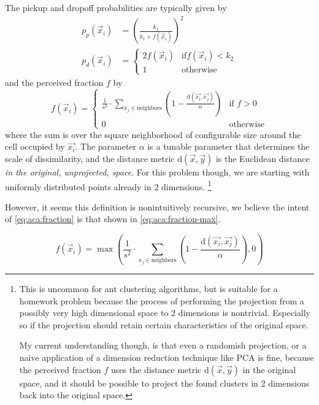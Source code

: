 \documentclass[12pt]{article}
\begin{document}
The pickup and dropoff probabilities are typically given by
\begin{align}
    p_p(\vec x_i) & = {\left(\frac{k_1}{k_1 + f(\vec x_i)}\right)}^2\label{eq:aca:pickup} \\
    p_d(\vec x_i) & = \begin{cases}
        2 f(\vec x_i) & \text{if} f(\vec x_i) < k_2 \\
        1             & \text{otherwise}
    \end{cases}\label{eq:aca:dropoff}
\end{align}
and the perceived fraction $f$ by
\begin{equation}
    f(\vec x_i) = \begin{cases}
        \displaystyle\frac{1}{s^2}\cdot\sum_{x_j \in \text{neighbors}}
        \left(1 - \frac{\mathrm{d}(\vec{x_i}, \vec{x_j})}{\alpha}\right) & \text{if } f > 0 \\
        0                                                                & \text{otherwise}
    \end{cases}\label{eq:aca:fraction}
\end{equation}
where the sum is over the square neighborhood of configurable size around the cell occupied by $\vec{x_i}$.
The parameter $\alpha$ is a tunable parameter that determines the scale of dissimilarity, and the distance metric $\mathrm d(\vec x, \vec y)$ is the Euclidean distance \textit{in the original, unprojected, space}.
For this problem though, we are starting with uniformly distributed points already in 2 dimensions.
\footnote{This is uncommon for ant clustering algorithms, but is suitable for a homework problem because the process of performing the projection from a possibly very high dimensional space to 2 dimensions is nontrivial.
    Especially so if the projection should retain certain characteristics of the original space.

    My current understanding though, is that even a randomish projection, or a naive application of a dimension reduction technique like PCA is fine, because the perceived fraction $f$ uses the distance metric $\mathrm{d}(\vec x, \vec y)$ in the original space, and it should be possible to project the found clusters in 2 dimensions back into the original space.}

However, it seems this definition is nonintuitively recursive, we believe the intent of \autoref{eq:aca:fraction} is that shown in \autoref{eq:aca:fraction-max}.

\begin{equation}
    f(\vec x_i) = \displaystyle\max\left(\frac{1}{s^2}\cdot\sum_{x_j \in \text{neighbors}}
    \left(1 - \frac{\mathrm{d}(\vec{x_i}, \vec{x_j})}{\alpha}\right), 0 \right)\label{eq:aca:fraction-max}
\end{equation}
\end{document}
